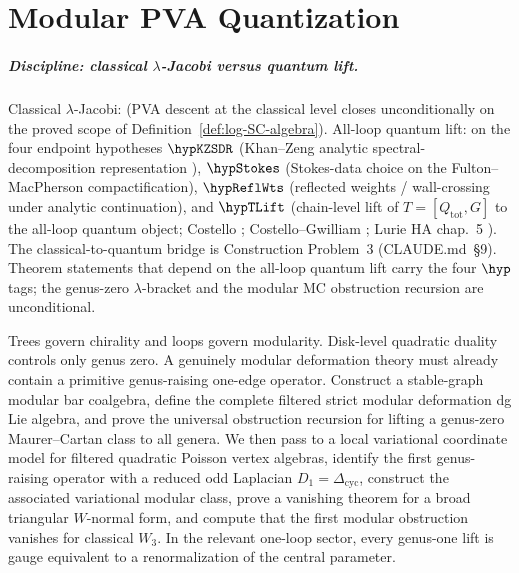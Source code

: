 \chapter{Modular PVA Quantization}
\label{ch:modular-pva-quantization-standalone}

\paragraph{Discipline: classical $\lambda$-Jacobi versus quantum lift.}
Classical $\lambda$-Jacobi: \ClaimStatusProvedHere{} (PVA descent at
the classical level closes unconditionally on the proved scope of
Definition~\ref{def:log-SC-algebra}). All-loop quantum lift:
\ClaimStatusConditional{} on the four endpoint hypotheses
$\hypKZSDR$ (Khan--Zeng analytic spectral-decomposition representation
\cite{KZ25}), $\hypStokes$ (Stokes-data choice on the Fulton--MacPherson
compactification), $\hypReflWts$ (reflected weights / wall-crossing
under analytic continuation), and $\hypTLift$ (chain-level lift of
$T = [Q_{\mathrm{tot}}, G]$ to the all-loop quantum object;
Costello \cite{Costello2011Renorm}; Costello--Gwilliam \cite{CG17};
Lurie HA chap.~5 \cite{LurieHA}). The classical-to-quantum bridge is
Construction Problem~3 (CLAUDE.md~\S9). Theorem statements that depend
on the all-loop quantum lift carry the four $\hyp$ tags; the genus-zero
$\lambda$-bracket and the modular MC obstruction recursion are
unconditional.

\begin{summary}
Trees govern chirality and loops govern modularity.
Disk-level quadratic duality controls only genus zero. A genuinely modular deformation
theory must already contain a primitive genus-raising one-edge operator. Construct a
stable-graph modular bar coalgebra, define the complete filtered strict modular deformation
dg Lie algebra, and prove the universal obstruction recursion for lifting a genus-zero
Maurer--Cartan class to all genera. We then pass to a local variational coordinate model
for filtered quadratic Poisson vertex algebras, identify the first genus-raising operator
with a reduced odd Laplacian $D_1=\Delta_{\mathrm{cyc}}$, construct the associated
variational modular class, prove a vanishing theorem for a broad triangular $W$-normal form,
and compute that the first modular obstruction vanishes for classical $W_3$.
In the relevant one-loop sector, every genus-one lift is gauge equivalent to a
renormalization of the central parameter.
\end{summary}

